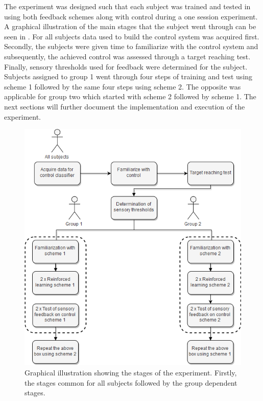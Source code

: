 The experiment was designed such that each subject was trained and tested in using both feedback schemes along with control during a one session experiment. A graphical illustration of the main stages that the subject went through can be seen in . For all subjects data used to build the control system was acquired first. Secondly, the subjects were given time to familiarize with the control system and subsequently, the achieved control was assessed through a target reaching test. Finally, sensory thresholds used for feedback were determined for the subject. Subjects assigned to group 1 went through four steps of training and test using scheme 1 followed by the same four steps using scheme 2. The opposite was applicable for group two which started with scheme 2 followed by scheme 1. The next sections will further document the implementation and execution of the experiment.     

\begin{figure}[H]                 
	\includegraphics[width=.59\textwidth]{figures/std_design}
	\caption{Graphical illustration showing the stages of the experiment. Firstly, the stages common for all subjects followed by the group dependent stages.}
	\label{fig:std} 
\end{figure}